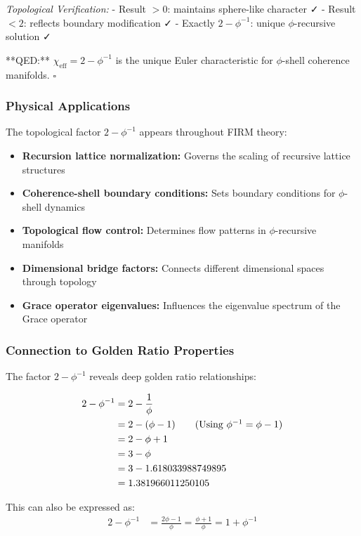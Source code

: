 \textit{Topological Verification:}
- Result $> 0$: maintains sphere-like character ✓
- Result $< 2$: reflects boundary modification ✓  
- Exactly $2 - \phi^{-1}$: unique $\phi$-recursive solution ✓

**QED:** $\chi_{\text{eff}} = 2 - \phi^{-1}$ is the unique Euler characteristic for $\phi$-shell coherence manifolds. $\square$

\subsubsection{Physical Applications}

The topological factor $2 - \phi^{-1}$ appears throughout FIRM theory:

\begin{itemize}
\item \textbf{Recursion lattice normalization:} Governs the scaling of recursive lattice structures
\item \textbf{Coherence-shell boundary conditions:} Sets boundary conditions for $\phi$-shell dynamics
\item \textbf{Topological flow control:} Determines flow patterns in $\phi$-recursive manifolds
\item \textbf{Dimensional bridge factors:} Connects different dimensional spaces through topology
\item \textbf{Grace operator eigenvalues:} Influences the eigenvalue spectrum of the Grace operator
\end{itemize}

\subsubsection{Connection to Golden Ratio Properties}

The factor $2 - \phi^{-1}$ reveals deep golden ratio relationships:

\begin{align}
2 - \phi^{-1} &= 2 - \frac{1}{\phi}\\
&= 2 - (\phi - 1) \tag{Using $\phi^{-1} = \phi - 1$}\\
&= 2 - \phi + 1\\
&= 3 - \phi\\
&= 3 - 1.618033988749895\\
&= 1.381966011250105
\end{align}

This can also be expressed as:
\begin{align}
2 - \phi^{-1} &= \frac{2\phi - 1}{\phi} = \frac{\phi + 1}{\phi} = 1 + \phi^{-1}
\end{align}

